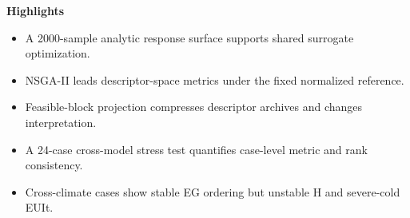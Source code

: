 \documentclass[11pt]{article}
\begin{document}
\noindent\textbf{Highlights}

\begin{itemize}
\item A 2000-sample analytic response surface supports shared surrogate optimization.
\item NSGA-II leads descriptor-space metrics under the fixed normalized reference.
\item Feasible-block projection compresses descriptor archives and changes interpretation.
\item A 24-case cross-model stress test quantifies case-level metric and rank consistency.
\item Cross-climate cases show stable EG ordering but unstable H and severe-cold EUIt.
\end{itemize}
\end{document}
